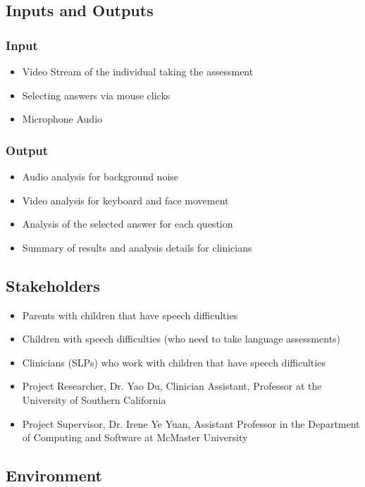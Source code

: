 \documentclass{article}
\begin{document}
\subsection{Inputs and Outputs}
\subsubsection{Input}
\begin{itemize}
\item Video Stream of the individual taking the assessment
\item Selecting answers via mouse clicks
\item Microphone Audio
\end{itemize}
\subsubsection{Output}
\begin{itemize}
\item Audio analysis for background noise
\item Video analysis for keyboard and face movement
\item Analysis of the selected answer for each question
\item Summary of results and analysis details for clinicians
\end{itemize}

\subsection{Stakeholders}
\begin{itemize}
    \item Parents with children that have speech difficulties
    \item Children with speech difficulties (who need to take language assessments)
    \item Clinicians (SLPs) who work with children that have speech difficulties
    \item Project Researcher, Dr. Yao Du, Clinician Assistant, Professor at the University of Southern California
    \item Project Supervisor, Dr. Irene Ye Yuan, Assistant Professor in the Department of Computing and Software at McMaster University
\end{itemize}

\subsection{Environment}
\end{document}
